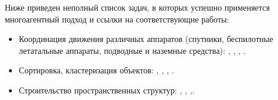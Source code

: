Ниже приведен неполный список задач, в которых успешно  применяется многоагентный подход и ссылки на соответствующие работы:
\begin{itemize}
\item Координация движения различных аппаратов (спутники, беспилотные летатальные аппараты, подводные и наземные средства): \cite{lafferriere2005decentralized}, \cite{veerman2005flocks}, \cite{vasarhelyi2014outdoor}, \cite{williams2005stable}.
\item Сортировка, кластеризация объектов: \cite{deneubourg1991dynamics}, \cite{ding2014sorting}, \cite{kabla2012collective}, \cite{santos2014segregation}.
\item Строительство пространственных структур: \cite{pennisi2014cooperative}, \cite{petersen2014collective}, \cite{augugliaro2013building},\cite{lindsey2011construction}.
\end{itemize}


\clearpage